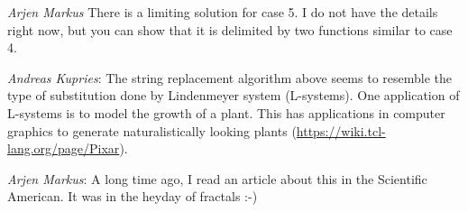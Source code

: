 \documentclass[onecolumn]{article}
\begin{document}
\emph{Arjen Markus} There is a limiting solution for case 5. I do not have the details right now,
but you can show that it is delimited by two functions similar to case 4.

\emph{Andreas Kupries}: The string replacement algorithm above seems to resemble the type of substitution done by
Lindenmeyer system (L-systems). One application of L-systems is to model the growth of a plant.
This has applications in computer graphics to generate naturalistically looking plants (\url{https://wiki.tcl-lang.org/page/Pixar}).

\emph{Arjen Markus}: A long time ago, I read an article about this in the Scientific American.
It was in the heyday of fractals :-)
\end{document}
